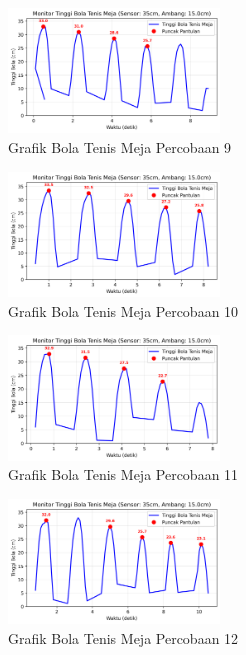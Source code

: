 \begin{figure}[htbp]
    \centering
    \includegraphics[width=0.5\textwidth]{chapters/DataPercobaan/Grafik_Bola_Tenis_Meja_9.png}
    \caption{Grafik Bola Tenis Meja Percobaan 9}
\end{figure}
\begin{figure}[htbp]
    \centering
    \includegraphics[width=0.5\textwidth]{chapters/DataPercobaan/Grafik_Bola_Tenis_Meja_10.png}
    \caption{Grafik Bola Tenis Meja Percobaan 10}
\end{figure}
\begin{figure}[htbp]
    \centering
    \includegraphics[width=0.5\textwidth]{chapters/DataPercobaan/Grafik_Bola_Tenis_Meja_11.png}
    \caption{Grafik Bola Tenis Meja Percobaan 11}
\end{figure}
\begin{figure}[htbp]
    \centering
    \includegraphics[width=0.5\textwidth]{chapters/DataPercobaan/Grafik_Bola_Tenis_Meja_12.png}
    \caption{Grafik Bola Tenis Meja Percobaan 12}
\end{figure}
